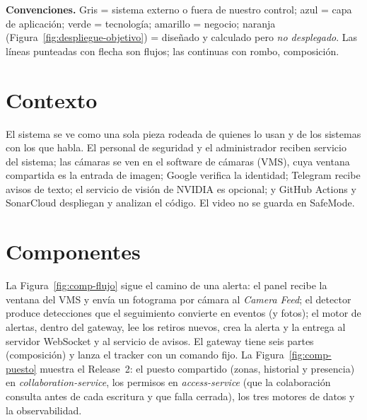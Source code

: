 \textbf{Convenciones.} Gris = sistema externo o fuera de nuestro control; azul = capa de aplicación; verde = tecnología; amarillo =
negocio; naranja (Figura~\ref{fig:despliegue-objetivo}) = diseñado y calculado pero \emph{no desplegado}. Las líneas punteadas con flecha son
flujos; las continuas con rombo, composición.

\section{Contexto}
El sistema se ve como una sola pieza rodeada de quienes lo usan y de los sistemas con los que habla. El personal de seguridad y el administrador
reciben servicio del sistema; las cámaras se ven en el software de cámaras (VMS), cuya ventana compartida es la entrada de imagen; Google
verifica la identidad; Telegram recibe avisos de texto; el servicio de visión de NVIDIA es opcional; y GitHub Actions y SonarCloud
despliegan y analizan el código. El video no se guarda en SafeMode.


\section{Componentes}
La Figura~\ref{fig:comp-flujo} sigue el camino de una alerta: el panel recibe la ventana del VMS y envía un fotograma por cámara al
\emph{Camera Feed}; el detector produce detecciones que el seguimiento convierte en eventos (y fotos); el motor de alertas, dentro del gateway,
lee los retiros nuevos, crea la alerta y la entrega al servidor WebSocket y al servicio de avisos. El gateway tiene seis partes (composición) y
lanza el tracker con un comando fijo. La Figura~\ref{fig:comp-puesto} muestra el Release~2: el puesto compartido (zonas, historial y presencia) en
\emph{collaboration-service}, los permisos en \emph{access-service} (que la colaboración consulta antes de cada escritura y que falla cerrada), los
tres motores de datos y la observabilidad.


